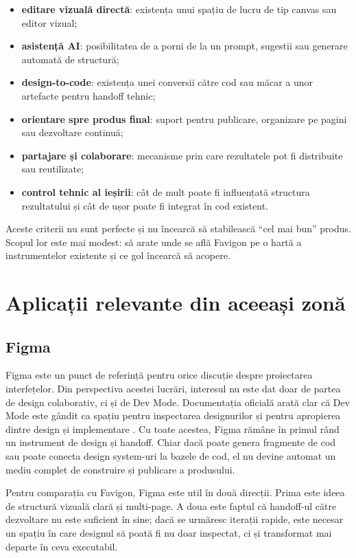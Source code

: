 \begin{itemize}[leftmargin=1.5cm]
  \item \textbf{editare vizuală directă}: existența unui spațiu de lucru de tip canvas sau editor vizual;
  \item \textbf{asistență AI}: posibilitatea de a porni de la un prompt, sugestii sau generare automată de structură;
  \item \textbf{design-to-code}: existența unei conversii către cod sau măcar a unor artefacte pentru handoff tehnic;
  \item \textbf{orientare spre produs final}: suport pentru publicare, organizare pe pagini sau dezvoltare continuă;
  \item \textbf{partajare și colaborare}: mecanisme prin care rezultatele pot fi distribuite sau reutilizate;
  \item \textbf{control tehnic al ieșirii}: cât de mult poate fi influențată structura rezultatului și cât de ușor poate fi integrat în cod existent.
\end{itemize}

Aceste criterii nu sunt perfecte și nu încearcă să stabilească ``cel mai bun'' produs. Scopul lor este mai modest: să arate unde se află Favigon pe o hartă a instrumentelor existente și ce gol încearcă să acopere.

\section{Aplicații relevante din aceeași zonă}

\subsection{Figma}

Figma este un punct de referință pentru orice discuție despre proiectarea interfețelor. Din perspectiva acestei lucrări, interesul nu este dat doar de partea de design colaborativ, ci și de Dev Mode. Documentația oficială arată clar că Dev Mode este gândit ca spațiu pentru inspectarea designurilor și pentru apropierea dintre design și implementare \cite{figmaDevMode2026}. Cu toate acestea, Figma rămâne în primul rând un instrument de design și handoff. Chiar dacă poate genera fragmente de cod sau poate conecta design system-uri la bazele de cod, el nu devine automat un mediu complet de construire și publicare a produsului.

Pentru comparația cu Favigon, Figma este util în două direcții. Prima este ideea de structură vizuală clară și multi-page. A doua este faptul că handoff-ul către dezvoltare nu este suficient în sine; dacă se urmăresc iterații rapide, este necesar un spațiu în care designul să poată fi nu doar inspectat, ci și transformat mai departe în ceva executabil.

